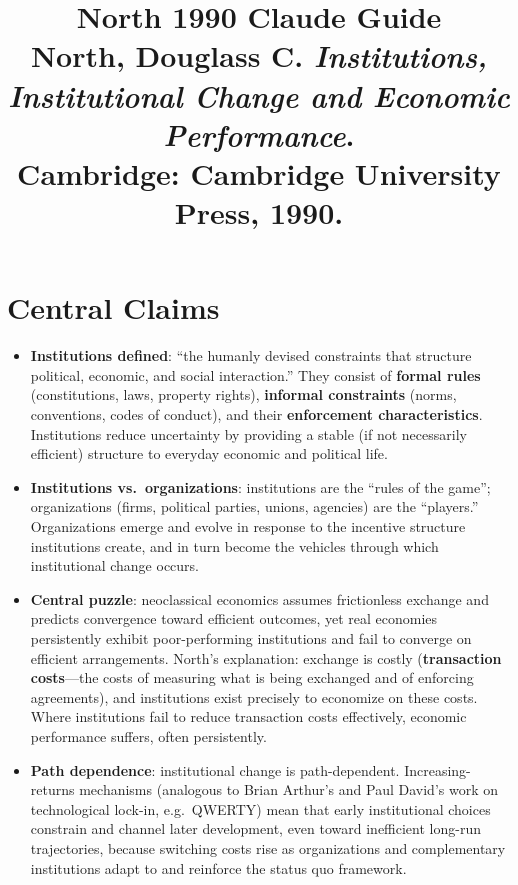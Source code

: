 \documentclass[12pt]{article}
\title{\textbf{North 1990 Claude Guide}\\
\large North, Douglass C. \textit{Institutions, Institutional Change and Economic Performance}.\\
Cambridge: Cambridge University Press, 1990.}
\author{}
\date{}
\begin{document}
\maketitle
\tableofcontents
\newpage

\section{Central Claims}

\begin{itemize}[leftmargin=*, itemsep=4pt]
    \item \textbf{Institutions defined}: ``the humanly devised constraints that structure political, economic, and social interaction.'' They consist of \textbf{formal rules} (constitutions, laws, property rights), \textbf{informal constraints} (norms, conventions, codes of conduct), and their \textbf{enforcement characteristics}. Institutions reduce uncertainty by providing a stable (if not necessarily efficient) structure to everyday economic and political life.
    \item \textbf{Institutions vs.\ organizations}: institutions are the ``rules of the game''; organizations (firms, political parties, unions, agencies) are the ``players.'' Organizations emerge and evolve in response to the incentive structure institutions create, and in turn become the vehicles through which institutional change occurs.
    \item \textbf{Central puzzle}: neoclassical economics assumes frictionless exchange and predicts convergence toward efficient outcomes, yet real economies persistently exhibit poor-performing institutions and fail to converge on efficient arrangements. North's explanation: exchange is costly (\textbf{transaction costs}---the costs of measuring what is being exchanged and of enforcing agreements), and institutions exist precisely to economize on these costs. Where institutions fail to reduce transaction costs effectively, economic performance suffers, often persistently.
    \item \textbf{Path dependence}: institutional change is path-dependent. Increasing-returns mechanisms (analogous to Brian Arthur's and Paul David's work on technological lock-in, e.g.\ QWERTY) mean that early institutional choices constrain and channel later development, even toward inefficient long-run trajectories, because switching costs rise as organizations and complementary institutions adapt to and reinforce the status quo framework.

\end{itemize}
\end{document}
